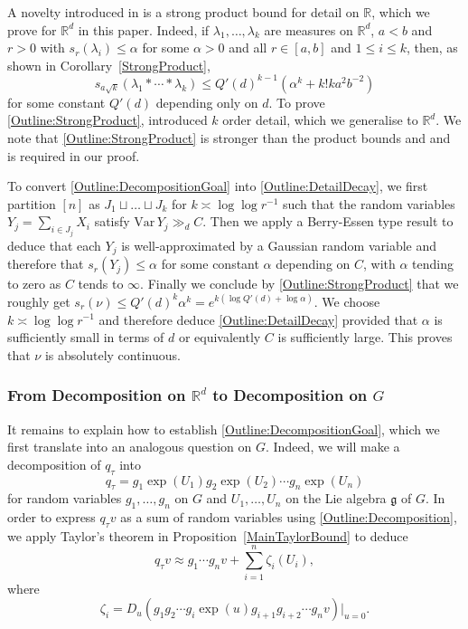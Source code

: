 \documentclass[10pt, english,oneside,reqno]{amsart}
\theoremstyle{plain}
\theoremstyle{remark}
\numberwithin{equation}{section}
\numberwithin{figure}{section}
\newcommand{\R}{\mathbb{R}}
\begin{document}
A novelty introduced in \cite{Kittle2023} is a strong product bound for detail on $\R$, which we prove for $\R^d$ in this paper. Indeed, if $\lambda_1, \ldots, \lambda_k$ are measures on $\R^d$, $a < b$ and $r > 0$ with $s_r(\lambda_i) \leq \alpha$ for some $\alpha > 0$ and all $r \in [a,b]$ and $1\leq i \leq k$, then, as shown in Corollary~\ref{StrongProduct}, 
\begin{equation}\label{Outline:StrongProduct}
    s_{a\sqrt{k}}(\lambda_1 * \cdots * \lambda_k) \leq Q'(d)^{k-1}(\alpha^k + k! ka^2b^{-2})
\end{equation}
for some constant $Q'(d)$ depending only on $d$. To prove \eqref{Outline:StrongProduct}, \cite{Kittle2023} introduced $k$ order detail, which we generalise to $\R^d$. We note that \eqref{Outline:StrongProduct} is stronger than the product bounds \cite[Theorem 1.17]{Kittle2021} and \cite[Theorem 3]{Varju2019} and is required in our proof. 

To convert \eqref{Outline:DecompositionGoal} into \eqref{Outline:DetailDecay}, we first partition $[n]$ as $J_1 \sqcup \ldots \sqcup J_k$ for $k\asymp \log \log r^{-1}$ such that the random variables $Y_j = \sum_{i \in J_j} X_i$ satisfy $\mathrm{Var}\, Y_j \gg_d C$. Then we apply a Berry-Essen type result to deduce that each $Y_j$ is well-approximated by a Gaussian random variable and therefore that $s_r(Y_j) \leq \alpha$ for some constant $\alpha$ depending on $C$, with $\alpha$ tending to zero as $C$ tends to $\infty$. Finally we conclude by \eqref{Outline:StrongProduct} that we roughly get $s_r(\nu) \leq Q'(d)^k\alpha^k = e^{k(\log Q'(d) + \log \alpha)}$. We choose $k \asymp \log \log r^{-1}$ and therefore deduce \eqref{Outline:DetailDecay} provided that $\alpha$ is sufficiently small in terms of $d$ or equivalently $C$ is sufficiently large. This proves that $\nu$ is absolutely continuous.

\subsubsection*{\normalfont\textbf{From Decomposition on $\R^d$ to Decomposition on $G$}} It remains to explain how to establish \eqref{Outline:DecompositionGoal}, which we first translate into an analogous question on $G$. Indeed, we will make a decomposition of $q_{\tau}$ into 
\begin{equation}\label{Outline:Decomposition}
    q_{\tau} = g_1\exp(U_1) g_2\exp(U_2) \cdots g_n \exp(U_n)
\end{equation}
for random variables $g_1, \ldots , g_n$ on $G$ and $U_1, \ldots , U_n$ on the Lie algebra $\mathfrak{g}$ of $G$. In order to express $q_{\tau}v$ as a sum of random variables using \eqref{Outline:Decomposition}, we apply Taylor's theorem in Proposition~\ref{MainTaylorBound} to deduce 
\begin{equation}\label{Outline:TaylorBound}
    q_{\tau}v \approx g_1\cdots g_n v + \sum_{i = 1}^n \zeta_i(U_i),
\end{equation}
where $$\zeta_i = D_u(g_1g_2\cdots g_i \exp(u)g_{i + 1}g_{i + 2}\cdots g_n v)|_{u = 0}.$$
\end{document}
